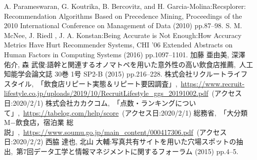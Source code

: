 \documentclass[honka]{nitkcthesis}%
\begin{document}










\backmatter



\begin{thebibliography}{99}
   A. Parameswaran,  G. Koutrika, B. Bercovitz, and H. Garcia-Molina:Recsplorer: Recommendation Algorithms Based on Precedence Mining, Proceedings of the 2010 International Conference on Management of Data (2010) pp.87--98.
   S. M. McNee, J. Riedl , J. A. Konstan:Being Accurate is Not Enough:How Accuracy Metrics Have Hurt Recommender Systems, CHI '06 Extended Abstracts on Human Factors in Computing Systems (2016) pp.1097--1101.
   加藤 亜由美, 深澤 佑介, 森 武俊:語幹と関連するオノマトペを用いた意外性の高い飲食店推薦,~人工知能学会論文誌 30巻 1号 SP2-B (2015) pp.216--228.
  株式会社リクルートライフスタイル,~「飲食店リピート実態＆リピート要因調査」,~\url{https://www.recruit-lifestyle.co.jp/uploads/2019/10/RecruitLifestyle\_ggs\_20191002.pdf}\ (アクセス日:2020/2/1)
  株式会社カカクコム,~「点数・ランキングについて」,~\url{https://tabelog.com/help/score}\ (アクセス日:2020/2/1)
   総務省,~「大分類M−飲食店，宿泊業 総説」,~\url{https://www.soumu.go.jp/main_content/000417306.pdf}\ (アクセス日:2020/2/2)
   西脇 達也, 北山 大輔:写真共有サイトを用いた穴場スポットの抽出,~第7回データ工学と情報マネジメントに関するフォーラム (2015) pp.4--5.
\end{thebibliography}


\appendix

\end{document}
